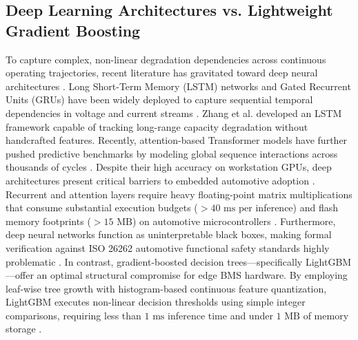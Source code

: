 \documentclass[pdflatex,sn-mathphys-num]{sn-jnl}%
\theoremstyle{thmstyleone}%
\theoremstyle{thmstyletwo}%
\theoremstyle{thmstylethree}%
\begin{document}
\subsection{Deep Learning Architectures vs. Lightweight Gradient Boosting}\label{subsec:dl_vs_gbt}
To capture complex, non-linear degradation dependencies across continuous operating trajectories, recent literature has gravitated toward deep neural architectures \cite{hong2020scalable,hong2020deep}. Long Short-Term Memory (LSTM) networks and Gated Recurrent Units (GRUs) have been widely deployed to capture sequential temporal dependencies in voltage and current streams \cite{zhang2018long,chen2022transformer}. Zhang et al. \cite{zhang2018long} developed an LSTM framework capable of tracking long-range capacity degradation without handcrafted features. Recently, attention-based Transformer models have further pushed predictive benchmarks by modeling global sequence interactions across thousands of cycles \cite{hannun2023deep,yao2021attention}. Despite their high accuracy on workstation GPUs, deep architectures present critical barriers to embedded automotive adoption \cite{baricelli2023embedded,ke2017lightgbm}. Recurrent and attention layers require heavy floating-point matrix multiplications that consume substantial execution budgets ($>40\text{ ms}$ per inference) and flash memory footprints ($>15\text{ MB}$) on automotive microcontrollers \cite{chen2016xgboost}. Furthermore, deep neural networks function as uninterpretable black boxes, making formal verification against ISO 26262 automotive functional safety standards highly problematic \cite{iso26262}. In contrast, gradient-boosted decision trees---specifically LightGBM \cite{ke2017lightgbm}---offer an optimal structural compromise for edge BMS hardware. By employing leaf-wise tree growth with histogram-based continuous feature quantization, LightGBM executes non-linear decision thresholds using simple integer comparisons, requiring less than $1\text{ ms}$ inference time and under $1\text{ MB}$ of memory storage \cite{baricelli2023lightweight}.
\end{document}
